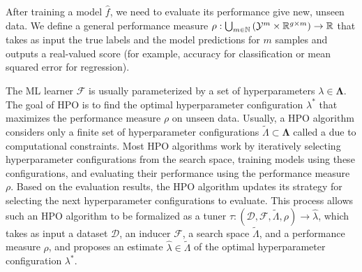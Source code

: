 After training a model \( \hat{f} \), we need to evaluate its performance give new, unseen data. We define a general performance measure \( \rho : \bigcup_{m \in \mathbb{N}} \left( \mathcal{Y}^m \times \mathbb{R}^{g \times m} \right) \to \mathbb{R} \) that takes as input the true labels and the model predictions for \( m \) samples and outputs a real-valued score (for example, accuracy for classification or mean squared error for regression).

The ML learner \( \mathscr{F} \) is usually parameterized by a set of hyperparameters \( \lambda \in \boldsymbol\Lambda \). The goal of HPO is to find the optimal hyperparameter configuration \( \lambda^* \) that maximizes the performance measure \( \rho \) on unseen data. Usually, a HPO algorithm considers only a finite set of hyperparameter configurations \( \tilde{\Lambda} \subset \boldsymbol\Lambda \) called a  due to computational constraints. Most HPO algorithms work by iteratively selecting hyperparameter configurations from the search space, training models using these configurations, and evaluating their performance using the performance measure \( \rho \). Based on the evaluation results, the HPO algorithm updates its strategy for selecting the next hyperparameter configurations to evaluate. This process allows such an HPO algorithm to be formalized as a tuner \( \tau : \left( \mathcal{D}, \mathscr{F}, \tilde{\Lambda}, \rho \right) \to \hat\lambda \), which takes as input a dataset \( \mathcal{D} \), an inducer \( \mathscr{F} \), a search space \( \tilde{\Lambda} \), and a performance measure \( \rho \), and proposes an estimate \( \hat{\lambda} \in \tilde{\Lambda} \) of the optimal hyperparameter configuration \( \lambda^* \).
